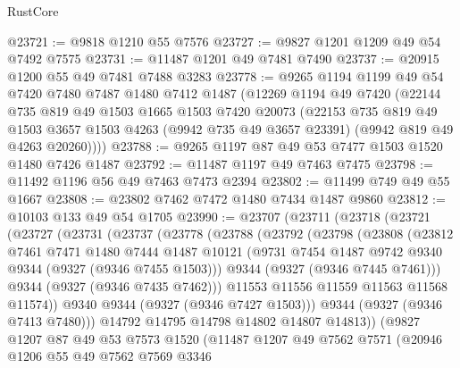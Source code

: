 \begin{lexlean}{RustCore}
\begin{coremodule}
@23721 := @9818 @1210 @55 @7576
@23727 := @9827 @1201 @1209 @49 @54 @7492 @7575
@23731 := @11487 @1201 @49 @7481 @7490
@23737 := @20915 @1200 @55 @49 @7481 @7488 @3283
@23778 := @9265
    @1194
    @1199
    @49
    @54
    @7420
    @7480
    @7487
    @1480
    @7412
    @1487
    (@12269
      @1194
      @49
      @7420
      (@22144
        @735
        @819
        @49
        @1503
        @1665
        @1503
        @7420
        @20073
        (@22153
          @735
          @819
          @49
          @1503
          @3657
          @1503
          @4263
          (@9942 @735 @49 @3657 @23391)
          (@9942 @819 @49 @4263 @20260))))
@23788 := @9265 @1197 @87 @49 @53 @7477 @1503 @1520 @1480 @7426 @1487
@23792 := @11487 @1197 @49 @7463 @7475
@23798 := @11492 @1196 @56 @49 @7463 @7473 @2394
@23802 := @11499 @749 @49 @55 @1667
@23808 := @23802 @7462 @7472 @1480 @7434 @1487 @9860
@23812 := @10103 @133 @49 @54 @1705
@23990 := @23707
    (@23711
      (@23718
        (@23721
          (@23727
            (@23731
              (@23737
                (@23778
                  (@23788
                    (@23792
                      (@23798
                        (@23808
                          (@23812
                            @7461
                            @7471
                            @1480
                            @7444
                            @1487
                            @10121
                            (@9731 @7454 @1487 @9742 @9340 @9344 (@9327 (@9346 @7455 @1503)))
                            @9344
                            (@9327 (@9346 @7445 @7461)))
                          @9344
                          (@9327 (@9346 @7435 @7462)))
                        @11553
                        @11556
                        @11559
                        @11563
                        @11568
                        @11574))
                    @9340
                    @9344
                    (@9327 (@9346 @7427 @1503)))
                  @9344
                  (@9327 (@9346 @7413 @7480)))
                @14792
                @14795
                @14798
                @14802
                @14807
                @14813))
            (@9827
              @1207
              @87
              @49
              @53
              @7573
              @1520
              (@11487
                @1207
                @49
                @7562
                @7571
                (@20946
                  @1206
                  @55
                  @49
                  @7562
                  @7569
                  @3346

\end{coremodule}
\end{lexlean}
